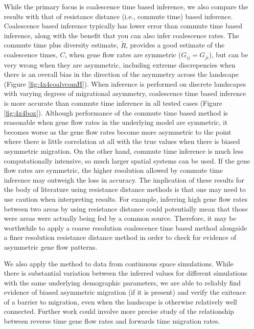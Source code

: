 \documentclass{article}
\newcommand{\comdist}{\widetilde R}
\begin{document}
While the primary focus is coalescence time based inference,
we also compare the results with that of resistance distance (i.e., commute time) based inference.
Coalescence based inference typically has lower error than commute time based inference,
along with the benefit that you can also infer coalescence rates. 
The commute time plus diversity estimate, $\comdist$, 
provides a good estimate of the coalescence times, $C$,
when gene flow rates are symmetric ($G_{ij} = G_{ji}$), 
but can be very wrong when they are asymmetric, 
including extreme discrepencies 
when there is an overall bias in the direction of the asymmetry across the landscape 
(Figure \ref{fig:4x4coalvcomH}).
When inference is performed on discrete landscapes 
with varying degrees of migrational asymmetry, 
coalescence time based inference is more accurate than commute time inference in all tested cases
(Figure \ref{fig:4x4box}).
Although performance of the commute time based method is reasonable 
when gene flow rates in the underlying model are symmetric, 
it becomes worse as the gene flow rates become more asymmetric 
to the point where there is little correlation at all with the true values 
when there is biased asymmetric migration.
On the other hand, commute time inference is much less computationally intensive, 
so much larger spatial systems can be used.
If the gene flow rates are symmetric, the higher resolution allowed by commute time inference
may outweigh the loss in accuracy.
The implication of these results for the body of literature using resistance distance methods
is that one may need to use caution when interpreting results.
For example, inferring high gene flow rates between two areas by using resistance distance
could potentially mean that those were areas were actually being fed by a common source.
Therefore, it may be worthwhile to apply a coarse resolution coalescence time based method 
alongside a finer resolution resistance distance method 
in order to check for evidence of asymmetric gene flow patterns.

We also apply the method to data from continuous space simulations. 
While there is substantial variation between the inferred values 
for different simulations with the same underlying demographic parameters, 
we are able to reliably find evidence of biased asymmetric migration (if it is present)
and verify the exitence of a barrier to migration, 
even when the landscape is otherwise relatively well connected.
Further work could involve more precise study of the relationship
between reverse time gene flow rates and forwards time migration rates.
\end{document}
